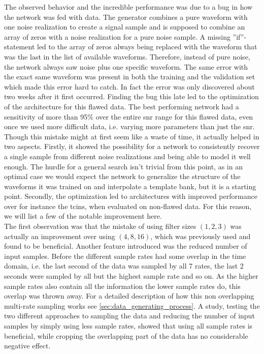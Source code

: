 The observed behavior and the incredible performance was due to a bug in how the network was fed with data. The generator combines a pure waveform with one noise realization to create a signal sample and is supposed to combine an array of zeros with a noise realization for a pure noise sample. A missing ''if''-statement led to the array of zeros always being replaced with the waveform that was the last in the list of available waveforms. Therefore, instead of pure noise, the network always saw noise plus one specific waveform. The same error with the exact same waveform was present in both the training and the validation set which made this error hard to catch. In fact the error was only discovered about two weeks after it first occurred. Finding the bug this late led to the optimization of the architecture for this flawed data. The best performing network had a sensitivity of more than 95\% over the entire \gls{snr} range for this flawed data, even once we used more difficult data, i.e. varying more parameters than just the \gls{snr}.\\
Though this mistake might at first seem like a waste of time, it actually helped in two aspects. Firstly, it showed the possibility for a network to consistently recover a single sample from different noise realizations and being able to model it well enough. The hurdle for a general search isn't trivial from this point, as in an optimal case we would expect the network to generalize the structure of the waveforms it was trained on and interpolate a template bank, but it is a starting point. Secondly, the optimization led to architectures with improved performance over for instance the \gls{tcin}s, when evaluated on non-flawed data. For this reason, we will list a few of the notable improvement here.\smallskip\\
The first observation was that the mistake of using filter sizes $(1,2,3)$ was actually an improvement over using $(4,8,16)$, which was previously used and found to be beneficial.
 Another feature introduced was the reduced number of input samples. Before the different sample rates had some overlap in the time domain, i.e. the last second of the data was sampled by all 7 rates, the last 2 seconds were sampled by all but the highest sample rate and so on. As the higher sample rates also contain all the information the lower sample rates do, this overlap was thrown away. For a detailed description of how this non overlapping multi-rate sampling works see \autoref{sec:data_generating_process}. A study, testing the two different approaches to sampling the data and reducing the number of input samples by simply using less sample rates, showed that using all sample rates is beneficial, while cropping the overlapping part of the data has no considerable negative effect.\\
